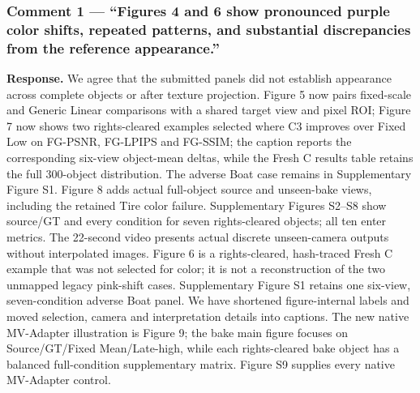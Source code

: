 \documentclass[
  10pt,
]{article}
\begin{document}
\hypertarget{comment-1-figures-4-and-6-show-pronounced-purple-color-shifts-repeated-patterns-and-substantial-discrepancies-from-the-reference-appearance.}{%
\subsubsection{Comment 1 --- ``Figures 4 and 6 show pronounced purple
color shifts, repeated patterns, and substantial discrepancies from the
reference
appearance.''}\label{comment-1-figures-4-and-6-show-pronounced-purple-color-shifts-repeated-patterns-and-substantial-discrepancies-from-the-reference-appearance.}}

\textbf{Response.} We agree that the submitted panels did not establish
appearance across complete objects or after texture projection. Figure 5
now pairs fixed-scale and Generic Linear comparisons with a shared
target view and pixel ROI; Figure 7 now shows two rights-cleared examples
selected where C3 improves over Fixed Low on FG-PSNR, FG-LPIPS and
FG-SSIM; the caption reports the corresponding six-view object-mean
deltas, while the Fresh C results table retains the full 300-object
distribution. The adverse Boat case remains in Supplementary Figure S1. Figure 8 adds actual full-object
source and unseen-bake views, including the retained Tire color failure.
Supplementary Figures S2--S8 show source/GT and every condition for
seven rights-cleared objects; all ten enter metrics. The 22-second video
presents actual discrete unseen-camera outputs without interpolated
images. Figure 6 is a rights-cleared, hash-traced Fresh C example that
was not selected for color; it is not a reconstruction of the two
unmapped legacy pink-shift cases. Supplementary Figure S1 retains one
six-view, seven-condition adverse Boat panel. We have shortened
figure-internal labels and moved selection, camera and interpretation
details into captions. The new native MV-Adapter illustration is Figure
9; the bake main figure focuses on Source/GT/Fixed Mean/Late-high, while
each rights-cleared bake object has a balanced full-condition
supplementary matrix. Figure S9 supplies every native MV-Adapter
control.
\end{document}

